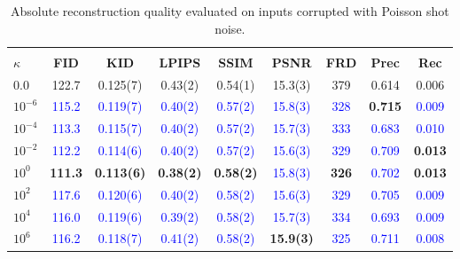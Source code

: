 \documentclass[twoside,11pt]{article}
\begin{document}
\begin{table}[ht!]
\centering
\renewcommand{\arraystretch}{1.4}
\setlength{\tabcolsep}{6pt}
\small
\begin{tabular}{lcccccccc}
\toprule
\rowcolor{gray!20}
\multicolumn{9}{c}{\textbf{Poisson Shot Noise - Absolute Scores}} \\
\textbf{$\kappa$} & \textbf{FID} & \textbf{KID} & \textbf{LPIPS} & \textbf{SSIM} & \textbf{PSNR} & \textbf{FRD} & \textbf{Prec} & \textbf{Rec} \\
\midrule
$0.0$        & 122.7 & 0.125(7) & 0.43(2) & 0.54(1) & 15.3(3) & 379 & 0.614 & 0.006 \\
$10^{-6}$    & \textcolor{blue}{115.2} & \textcolor{blue}{0.119(7)} & \textcolor{blue}{0.40(2)} & \textcolor{blue}{0.57(2)} & \textcolor{blue}{15.8(3)} & \textcolor{blue}{328} & \textbf{\textcolor{green!50!black}{0.715}} & \textcolor{blue}{0.009} \\
$10^{-4}$    & \textcolor{blue}{113.3} & \textcolor{blue}{0.115(7)} & \textcolor{blue}{0.40(2)} & \textcolor{blue}{0.57(2)} & \textcolor{blue}{15.7(3)} & \textcolor{blue}{333} & \textcolor{blue}{0.683} & \textcolor{blue}{0.010} \\
$10^{-2}$    & \textcolor{blue}{112.2} & \textcolor{blue}{0.114(6)} & \textcolor{blue}{0.40(2)} & \textcolor{blue}{0.57(2)} & \textcolor{blue}{15.6(3)} & \textcolor{blue}{329} & \textcolor{blue}{0.709} & \textbf{\textcolor{green!50!black}{0.013}} \\
$10^{0}$     & \textbf{\textcolor{green!50!black}{111.3}} & \textbf{\textcolor{green!50!black}{0.113(6)}} & \textbf{\textcolor{green!50!black}{0.38(2)}} & \textbf{\textcolor{green!50!black}{0.58(2)}} & \textcolor{blue}{15.8(3)} & \textbf{\textcolor{green!50!black}{326}} & \textcolor{blue}{0.702} & \textbf{\textcolor{green!50!black}{0.013}} \\
$10^{2}$     & \textcolor{blue}{117.6} & \textcolor{blue}{0.120(6)} & \textcolor{blue}{0.40(2)} & \textcolor{blue}{0.58(2)} & \textcolor{blue}{15.6(3)} & \textcolor{blue}{329} & \textcolor{blue}{0.705} & \textcolor{blue}{0.009} \\
$10^{4}$     & \textcolor{blue}{116.0} & \textcolor{blue}{0.119(6)} & \textcolor{blue}{0.39(2)} & \textcolor{blue}{0.58(2)} & \textcolor{blue}{15.7(3)} & \textcolor{blue}{334} & \textcolor{blue}{0.693} & \textcolor{blue}{0.009} \\
$10^{6}$     & \textcolor{blue}{116.2} & \textcolor{blue}{0.118(7)} & \textcolor{blue}{0.41(2)} & \textcolor{blue}{0.58(2)} & \textbf{\textcolor{green!50!black}{15.9(3)}} & \textcolor{blue}{325} & \textcolor{blue}{0.711} & \textcolor{blue}{0.008} \\
\bottomrule
\end{tabular}
\caption{Absolute reconstruction quality evaluated on inputs corrupted with Poisson shot noise.}
\label{tab:robustness_shot_noise_abs}
\end{table}
\end{document}
